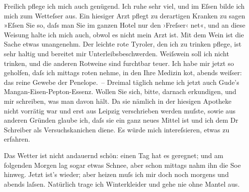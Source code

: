 \pstart
           Freilich pflege ich mich auch genügend. Ich ruhe sehr viel, und im Eſsen bilde ich
               mich zum Wetteſser aus. Ein hiesiger Arzt pflegt zu derartigen Kranken zu sagen
               »Eſsen Sie so, daſs man Sie im ganzen Hotel nur den ›Freſser‹ ne{\geminationn}t«, und an diese Weisung halte ich mich auch, obwol es
               nicht mein Arzt ist. Mit dem Wein ist die Sache etwas unangenehm. {\pb}Der leichte rote Tyroler, den ich zu trinken pflege,
               ist sehr \label{K_L00181-1v}\label{K_L00181-1}haltig und
               bereitet mir Unterleibsbeschwerden. Weiſswein soll ich nicht trinken, und die anderen
               Rotweine sind furchtbar teuer. Ich habe mir jetzt so geholfen, daſs ich mittags roten
               nehme, in den Ihre Medizin ko{\geminationm}t, abends weiſser: das
               reine Gewebe der Penelope. – Dreimal täglich nehme ich jetzt auch Gude’s Mangan-Eisen-Pepton-Essenz. Wollen Sie sich, bitte, darnach
               erkundigen, und mir schreiben, was man davon hält. Da sie nämlich in der hiesigen
               Apotheke nicht vorrätig war und erst aus Leipzig
               verschrieben werden muſste, sowie aus anderen Gründen glaube ich, daſs sie ein ganz
               neues Mittel ist und ich dem Dr Schreiber als
               Versuchskanichen diene. Es würde mich intereſsieren, etwas zu erfahren.\pend
           
\pstart
           Das Wetter ist nicht andauernd schön: einen Tag hat es geregnet; und am folgenden
               Morgen lag sogar etwas Schnee, aber schon mittags nahm ihn die So{\geminationn}e hinweg. Jetzt ist’s wieder; aber heizen muſs ich mir
               doch noch morgens und abends laſsen. Natürlich trage ich Winterkleider und gehe nie
               ohne Mantel aus.\pend
           
